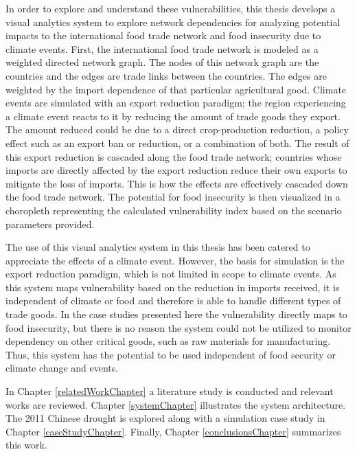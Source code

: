 In order to explore and understand these vulnerabilities, this thesis develops a visual analytics system to explore network dependencies for analyzing potential impacts to the international food trade network and food insecurity due to climate events. First, the international food trade network is modeled as a weighted directed network graph. The nodes of this network graph are the countries and the edges are trade links between the countries. The edges are weighted by the import dependence of that particular agricultural good. Climate events are simulated with an export reduction paradigm; the region experiencing a climate event reacts to it by reducing the amount of trade goods they export. The amount reduced could be due to a direct crop-production reduction, a policy effect such as an export ban or reduction, or a combination of both. The result of this export reduction is cascaded along the food trade network; countries whose imports are directly affected by the export reduction reduce their own exports to mitigate the loss of imports. This is how the effects are effectively cascaded down the food trade network. The potential for food insecurity is then visualized in a choropleth representing the calculated vulnerability index based on the scenario parameters provided.\par
The use of this visual analytics system in this thesis has been catered to appreciate the effects of a climate event. However, the basis for simulation is the export reduction paradigm, which is not limited in scope to climate events. As this system maps vulnerability based on the reduction in imports received, it is independent of climate or food and therefore is able to handle different types of trade goods. In the case studies presented here the vulnerability directly maps to food insecurity, but there is no reason the system could not be utilized to monitor dependency on other critical goods, such as raw materials for manufacturing. Thus, this system has the potential to be used independent of food security or climate change and events.\par
In Chapter \ref{relatedWorkChapter} a literature study is conducted and relevant works are reviewed. Chapter \ref{systemChapter} illustrates the system architecture. The 2011 Chinese drought is explored along with a simulation case study in Chapter \ref{caseStudyChapter}. Finally, Chapter \ref{conclusionsChapter} summarizes this work.